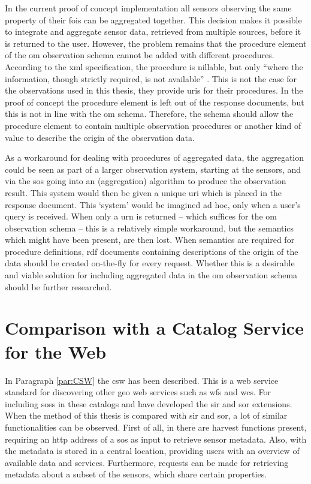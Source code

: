 In the current proof of concept implementation all sensors observing the same property of their \acp{foi} can be aggregated together. This decision makes it possible to integrate and aggregate sensor data, retrieved from multiple sources, before it is returned to the user. However, the problem remains that the procedure element of the \ac{om} observation schema cannot be added with different procedures. According to the \ac{xml} specification, the procedure is nillable, but only \enquote{where the information, though strictly required, is not available} \citep[p. 42]{SW:OGC8}. This is not the case for the observations used in this thesis, they provide \acp{uri} for their procedures. In the proof of concept the procedure element is left out of the response documents, but this is not in line with the \ac{om} schema. Therefore, the schema should allow the procedure element to contain multiple observation procedures or another kind of value to describe the origin of the observation data. 

As a workaround for dealing with procedures of aggregated data, the aggregation could be seen as part of a larger observation system, starting at the sensors, and via the \ac{sos} going into an (aggregation) algorithm to produce the observation result. This system would then be given a unique \ac{uri} which is placed in the response document. This `system' would be imagined ad hoc, only when a user's query is received. When only a \ac{urn} is returned -- which suffices for the \ac{om} observation schema -- this is a relatively simple workaround, but the semantics which might have been present, are then lost. When semantics are required for procedure definitions, \ac{rdf} documents containing descriptions of the origin of the data should be created on-the-fly for every request. Whether this is a desirable and viable solution for including aggregated data in the \ac{om} observation schema should be further researched.        

\section{Comparison with a Catalog Service for the Web}
In Paragraph \ref{par:CSW} the \acl{csw} has been described. This is a web service standard for discovering other geo web services such as \ac{wfs} and \ac{wcs}. For including \aclp{sos} in these catalogs \cite{SW:OGC4} and \cite{SW:OGC3} have developed the \ac{sir} and \ac{sor} extensions. When the method of this thesis is compared with \ac{sir} and \ac{sor}, a lot of similar functionalities can be observed. First of all, in there are harvest functions present, requiring an \ac{http} address of a \ac{sos} as input to retrieve sensor metadata. Also, with the metadata is stored in a central location, providing users with an overview of available data and services. Furthermore, requests can be made for retrieving metadata about a subset of the sensors, which share certain properties.  

